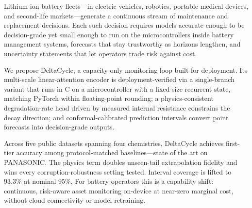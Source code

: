 \documentclass{indojc}
\begin{document}




\begin{jabstract}
    
Lithium-ion battery fleets---in electric vehicles, robotics,
portable medical devices, and second-life markets---generate a
continuous stream of maintenance and replacement decisions. Each such
decision requires models accurate enough to be decision-grade yet
small enough to run on the microcontrollers inside battery management
systems, forecasts that stay trustworthy as horizons lengthen, and
uncertainty statements that let operators trade risk against cost.

We propose DeltaCycle, a capacity-only monitoring loop built for
deployment. Its multi-scale linear-attention encoder is
deployment-verified via a single-branch variant that runs in C on a
microcontroller with a fixed-size recurrent state, matching PyTorch
within floating-point rounding; a physics-consistent degradation-rate
head driven by measured internal resistance constrains the decay
direction; and conformal-calibrated prediction intervals convert point
forecasts into decision-grade outputs.

Across five public datasets spanning four chemistries, DeltaCycle
achieves first-tier accuracy among protocol-matched baselines---state
of the art on PANASONIC. The physics term doubles unseen-tail
extrapolation fidelity and wins every corruption-robustness setting
tested. Interval coverage is lifted to $93.3\%$ at nominal $95\%$.
For battery operators this is a capability shift: continuous,
risk-aware asset monitoring on-device at near-zero marginal cost,
without cloud connectivity or model retraining.
\end{jabstract}

\end{document}
